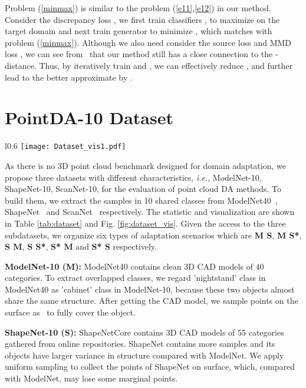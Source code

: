 \documentclass{article}
\newcommand*\ie{\textit{i.e.}}
\begin{document}
Problem (\ref{minmax}) is similar to the problem (\ref{e11},\ref{e12}) in our method. Consider the discrepancy loss , we first train classifiers ,  to maximize  on the target domain and next train generator  to minimize , which matches with problem (\ref{minmax}). Although we also need consider the source loss  and MMD loss , we can see from~\cite{proof_conver1} that our method still has a close connection to the - distance. Thus, by iteratively train  and , we can effectively reduce , and further lead to the better approximate  by .


\newpage
\section{PointDA-10 Dataset}

\begin{wrapfigure}{l}{0.6\textwidth}
\texttt{[image: Dataset\_vis1.pdf]}
\caption{Samples of PointDA-10 dataset.} 
\label{fig:dataset_vis}

\end{wrapfigure}
As there is no 3D point cloud benchmark designed for domain adaptation, we propose three datasets with different characteristics, \ie, ModelNet-10, ShapeNet-10, ScanNet-10, for the evaluation of point cloud DA methods. To build them, we extract the samples in 10 shared classes from  ModelNet40~\cite{wu20153d}, ShapeNet~\cite{chang2015shapenet} and ScanNet~\cite{dai2017scannet} respectively. The statistic and visualization are shown in Table \ref{tab:dataset} and Fig. \ref{fig:dataset_vis}. Given the access to the three subdatasets, we organize six types of adaptation scenarios which are \textbf{M  S}, \textbf{M  S*}, \textbf{S  M}, \textbf{S  S*}, \textbf{S*  M} and \textbf{S*  S} respectively.







\textbf{ModelNet-10 (M):} ModelNet40 contains clean 3D CAD models of 40 categories. To extract overlapped classes, we regard 'nightstand' class in ModelNet40 as 'cabinet' class in ModelNet-10, because these two objects almost share the same structure. After getting the CAD model, we sample points on the surface as~\cite{qi2017pointnet++} to fully cover the object.

\textbf{ShapeNet-10 (S):} ShapeNetCore contains 3D CAD models of 55 categories gathered from online repositories. ShapeNet contains more samples and its objects have larger variance in structure compared with ModelNet. We apply uniform sampling to collect the points of ShapeNet on surface, which, compared with ModelNet, may lose some marginal points.
\end{document}
